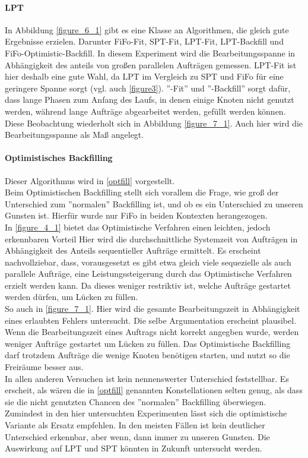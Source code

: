 \paragraph{LPT}
In Abbildung \ref{figure_6_1} gibt es eine Klasse an Algorithmen, die gleich gute Ergebnisse erzielen. Darunter FiFo-Fit, SPT-Fit, LPT-Fit, LPT-Backfill und FiFo-Optimistic-Backfill. In diesem Experiment wird die Bearbeitungsspanne in Abhängigkeit des anteils von großen parallelen Aufträgen gemessen. LPT-Fit ist hier deshalb eine gute Wahl, da LPT im Vergleich zu SPT und FiFo für eine geringere Spanne sorgt (vgl. auch \ref{figure3}). ''-Fit'' und ''-Backfill'' sorgt dafür, dass lange Phasen zum Anfang des Laufs, in denen einige Knoten nicht genutzt werden, während lange Aufträge abgearbeitet werden, gefüllt werden können.\\
Diese Beobachtung wiederholt sich in Abbildung \ref{figure_7_1}. Auch hier wird die Bearbeitungsspanne als Maß angelegt.\\

\paragraph{Optimistisches Backfilling}
Dieser Algorithmus wird in \ref{optfill} vorgestellt.\\
Beim Optimistischen Backfilling stellt sich vorallem die Frage, wie groß der Unterschied zum ''normalen'' Backfilling ist, und ob es ein Unterschied zu unseren Gunsten ist. Hierfür wurde nur FiFo in beiden Kontexten herangezogen.\\
In \ref{figure_4_1} bietet das Optimistische Verfahren einen leichten, jedoch erkennbaren Vorteil Hier wird die durchschnittliche Systemzeit von Aufträgen in Abhängigkeit des Anteils sequentieller Aufträge ermittelt. Es erscheint nachvollziebar, dass, vorausgesetzt es gibt etwa gleich viele sequezielle als auch parallele Aufträge, eine Leistungssteigerung durch das Optimistische Verfahren erzielt werden kann. Da dieses weniger restriktiv ist, welche Aufträge gestartet werden dürfen, um Lücken zu füllen.\\
So auch in \ref{figure_7_1}. Hier wird die gesamte Bearbeitungszeit in Abhängigkeit eines erlaubten Fehlers untersucht. Die selbe Argumentation erscheint plausibel. Wenn die Bearbeitungszeit eines Auftrags nicht korrekt angegben wurde, werden weniger Aufträge gestartet um Lücken zu füllen. Das Optimistische Backfilling darf trotzdem Aufträge die wenige Knoten benötigen starten, und nutzt so die Freiräume besser aus.\\
In allen anderen Versuchen ist kein nennenswerter Unterschied feststellbar. Es erscheit, als wären die in \ref{optfill} genannten Konstellationen selten genug, als dass sie die nicht genutzten Chancen des ''normalen'' Backfilling überwiegen. Zumindest in den hier untersuchten Experimenten lässt sich die optimistische Variante als Ersatz empfehlen. In den meisten Fällen ist kein deutlicher Unterschied erkennbar, aber wenn, dann immer zu unseren Gunsten. Die Auswirkung auf LPT und SPT könnten in Zukunft untersucht werden. 

